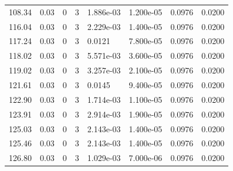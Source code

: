 \documentclass[preview]{standalone}
\begin{document}
{{{\begin{tabular}{L{1.2cm}C{1.2cm} C{0.3cm}C{0.5cm} C{1.4cm}C{1.4cm} C{1.4cm}C{1.4cm}}
  108.34  &  0.03  & 0     &  3 &  1.886e-03  & 1.200e-05  & 0.0976 &  0.0200   \\ 
  116.04  &  0.03  & 0     &  3 &  2.229e-03  & 1.400e-05  & 0.0976 &  0.0200   \\ 
  117.24  &  0.03  & 0     &  3 &  0.0121  & 7.800e-05  & 0.0976 &  0.0200   \\ 
  118.02  &  0.03  & 0     &  3 &  5.571e-03  & 3.600e-05  & 0.0976 &  0.0200   \\ 
  119.02  &  0.03  & 0     &  3 &  3.257e-03  & 2.100e-05  & 0.0976 &  0.0200   \\ 
  121.61  &  0.03  & 0     &  3 &  0.0145  & 9.400e-05  & 0.0976 &  0.0200   \\ 
  122.90  &  0.03  & 0     &  3 &  1.714e-03  & 1.100e-05  & 0.0976 &  0.0200   \\ 
  123.91  &  0.03  & 0     &  3 &  2.914e-03  & 1.900e-05  & 0.0976 &  0.0200   \\ 
  125.03  &  0.03  & 0     &  3 &  2.143e-03  & 1.400e-05  & 0.0976 &  0.0200   \\ 
  125.46  &  0.03  & 0     &  3 &  2.143e-03  & 1.400e-05  & 0.0976 &  0.0200   \\ 
  126.80  &  0.03  & 0     &  3 &  1.029e-03  & 7.000e-06  & 0.0976 &  0.0200   \\ 
\hline 
\end{tabular} 

}}}
\end{document}
